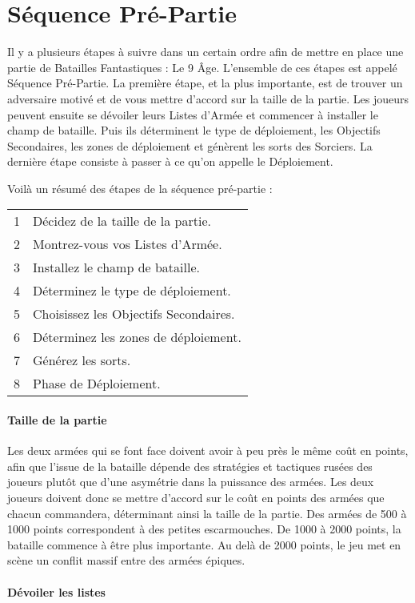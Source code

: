 
\part{Séquence Pré-Partie}

Il y a plusieurs étapes à suivre dans un certain ordre afin de mettre en place une partie de Batailles Fantastiques : Le 9\ieme{} Âge. L'ensemble de ces étapes est appelé Séquence Pré-Partie. La première étape, et la plus importante, est de trouver un adversaire motivé et de vous mettre d'accord sur la taille de la partie. Les joueurs peuvent ensuite se dévoiler leurs Listes d'Armée et commencer à installer le champ de bataille. Puis ils déterminent le type de déploiement, les Objectifs Secondaires, les zones de déploiement et génèrent les sorts des Sorciers. La dernière étape consiste à passer à ce qu'on appelle le Déploiement.

Voilà un résumé des étapes de la séquence pré-partie :

\hspace*{0.3cm}
\begin{tabular}{c|l}
1 & Décidez de la taille de la partie. \tabularnewline
2 & Montrez-vous vos Listes d'Armée. \tabularnewline
3 & Installez le champ de bataille. \tabularnewline
4 & Déterminez le type de déploiement. \tabularnewline
5 & Choisissez les Objectifs Secondaires. \tabularnewline
6 & Déterminez les zones de déploiement. \tabularnewline
7 & Générez les sorts. \tabularnewline
8 & Phase de Déploiement. \tabularnewline
\end{tabular}

\hypertarget{gamesize}{\subsection{Taille de la partie}}

Les deux armées qui se font face doivent avoir à peu près le même coût en points, afin que l'issue de la bataille dépende des stratégies et tactiques rusées des joueurs plutôt que d'une asymétrie dans la puissance des armées. Les deux joueurs doivent donc se mettre d'accord sur le coût en points des armées que chacun commandera, déterminant ainsi la taille de la partie. Des armées de 500 à 1000 points correspondent à des petites escarmouches. De 1000 à 2000 points, la bataille commence à être plus importante. Au delà de 2000 points, le jeu met en scène un conflit massif entre des armées épiques.

\hypertarget{sharearmylist}{\subsection{Dévoiler les listes}}


